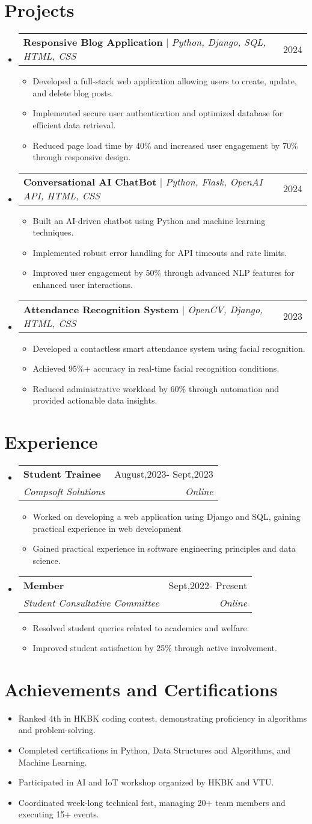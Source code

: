 \documentclass[letterpaper,11pt]{article}
\makeatletter
\newcommand{\resumeItem}[1]{
  \item\small{
    {#1 \vspace{-2pt}}
  }
}
\newcommand{\resumeSubheading}[4]{
  \vspace{-2pt}\item
    \begin{tabular*}{0.97\textwidth}[t]{l@{\extracolsep{\fill}}r}
      \textbf{#1} & #2 \\
      \textit{\small#3} & \textit{\small #4} \\
    \end{tabular*}\vspace{-7pt}
}
\newcommand{\resumeProjectHeading}[2]{
    \item
    \begin{tabular*}{0.97\textwidth}{l@{\extracolsep{\fill}}r}
      \small#1 & #2 \\
    \end{tabular*}\vspace{-7pt}
}
\newcommand{\resumeSubHeadingListStart}{\begin{itemize}[leftmargin=0.15in, label={}]}
\newcommand{\resumeSubHeadingListEnd}{\end{itemize}}
\newcommand{\resumeItemListStart}{\begin{itemize}}
\newcommand{\resumeItemListEnd}{\end{itemize}\vspace{-5pt}}
\makeatother
\begin{document}
\section{Projects}
\resumeSubHeadingListStart
  \resumeProjectHeading
    {\textbf{Responsive Blog Application} $|$ \textit{Python, Django, SQL, HTML, CSS}}{2024}
    \resumeItemListStart
      \resumeItem{Developed a full-stack web application allowing users to create, update, and delete blog posts.}
      \resumeItem{Implemented secure user authentication and optimized database for efficient data retrieval.}
      \resumeItem{Reduced page load time by 40\% and increased user engagement by 70\% through responsive design.}
    \resumeItemListEnd
  \resumeProjectHeading
    {\textbf{Conversational AI ChatBot} $|$ \textit{Python, Flask, OpenAI API, HTML, CSS}}{2024}
    \resumeItemListStart
      \resumeItem{Built an AI-driven chatbot using Python and machine learning techniques.}
      \resumeItem{Implemented robust error handling for API timeouts and rate limits.}
      \resumeItem{Improved user engagement by 50\% through advanced NLP features for enhanced user interactions.}
    \resumeItemListEnd
  \resumeProjectHeading
    {\textbf{Attendance Recognition System} $|$ \textit{OpenCV, Django, HTML, CSS}}{2023}
    \resumeItemListStart
      \resumeItem{Developed a contactless smart attendance system using facial recognition.}
      \resumeItem{Achieved 95\%+ accuracy in real-time facial recognition conditions.}
      \resumeItem{Reduced administrative workload by 60\% through automation and provided actionable data insights.}
    \resumeItemListEnd
\resumeSubHeadingListEnd

\section{Experience}
\resumeSubHeadingListStart
  \resumeSubheading
    {Student Trainee}{August,2023- Sept,2023}
    {Compsoft Solutions}{Online}
    \resumeItemListStart
      \resumeItem{Worked on developing a web application using Django and SQL, gaining practical experience in web development}
      \resumeItem{Gained practical experience in software engineering principles and data science.}
    \resumeItemListEnd
  \resumeSubheading
    {Member}{ Sept,2022- Present}
    { Student Consultative Committee}{Online}
    \resumeItemListStart
      \resumeItem{Resolved student queries related to academics and welfare.}
      \resumeItem{Improved student satisfaction by 25\% through active involvement.}
    \resumeItemListEnd
\resumeSubHeadingListEnd

\section{Achievements and Certifications}
\resumeItemListStart
  \resumeItem{Ranked 4th in HKBK coding contest, demonstrating proficiency in algorithms and problem-solving.}
  \resumeItem{Completed certifications in Python, Data Structures and Algorithms, and Machine Learning.}
  \resumeItem{Participated in AI and IoT workshop organized by HKBK and VTU.}
  \resumeItem{Coordinated week-long technical fest, managing 20+ team members and executing 15+ events.}
\resumeItemListEnd
\end{document}
